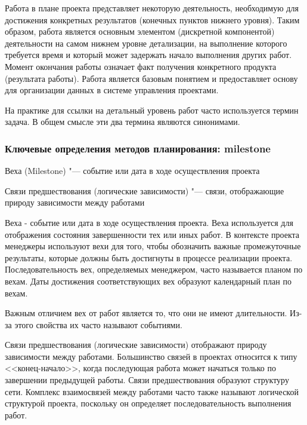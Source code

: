 \documentclass{../industrial-development}
\begin{document}
Работа в плане проекта представляет некоторую деятельность, необходимую для достижения конкретных результатов (конечных пунктов нижнего уровня). Таким образом, работа является основным элементом (дискретной компонентой) деятельности на самом нижнем уровне детализации, на выполнение которого требуется время и который может задержать начало выполнения других работ. Момент окончания работы означает факт получения конкретного продукта (результата работы). Работа является базовым понятием и предоставляет основу для организации данных в системе управления проектами.

На практике для ссылки на детальный уровень работ часто используется термин задача. В общем смысле эти два термина являются синонимами.

    \begin{frame} \frametitle{Ключевые определения методов планирования: milestone}
        \begin{definition}
            \alert{Веха (Milestone)} "--- событие или дата в ходе осуществления проекта
        \end{definition}
        \begin{definition}
            \alert{Связи предшествования (логические зависимости)} "--- связи, отображающие природу зависимости между работами
        \end{definition}
    \end{frame}
    \lecturenotes

Веха - событие или дата в ходе осуществления проекта. Веха используется для отображения состояния завершенности тех или иных работ. В контексте проекта менеджеры используют вехи для того, чтобы обозначить важные промежуточные результаты, которые должны быть достигнуты в процессе реализации проекта. Последовательность вех, определяемых менеджером, часто называется планом по вехам. Даты достижения соответствующих вех образуют календарный план по вехам.

Важным отличием вех от работ является то, что они не имеют длительности. Из-за этого свойства их часто называют событиями.

Связи предшествования (логические зависимости) отображают природу зависимости между работами. Большинство связей в проектах относится к типу <<конец-начало>>, когда последующая работа может начаться только по завершении предыдущей работы. Связи предшествования образуют структуру сети. Комплекс взаимосвязей между работами часто также называют логической структурой проекта, поскольку он определяет последовательность выполнения работ.
\end{document}
